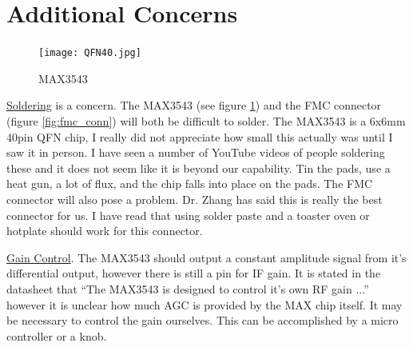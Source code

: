 \documentclass[a4paper, 12pt]{article}
\begin{document}
\section{Additional Concerns}

\begin{figure}
\caption{MAX3543}
\label{fig:qfn40}
\centerline{\texttt{[image: QFN40.jpg]}}
\end{figure}

\underline{Soldering} is a concern.  The MAX3543 (see figure \ref{fig:qfn40}) and the FMC connector (figure \ref{fig:fmc_conn}) will both be difficult to solder.  The MAX3543 is a 6x6mm 40pin QFN chip, I really did not appreciate how small this actually was until I saw it in person.  I have seen a number of YouTube videos of people soldering these and it does not seem like it is beyond our capability.  Tin the pads, use a heat gun, a lot of flux, and the chip falls into place on the pads.  The FMC connector will also pose a problem.  Dr. Zhang has said this is really the best connector for us.  I have read that using solder paste and a toaster oven or hotplate should work for this connector.

\underline{Gain Control}.  The MAX3543 should output a constant amplitude signal from it's differential output, however there is still a pin for IF gain.  It is stated in the datasheet that ``The MAX3543 is designed to control it's own RF gain ...'' however it is unclear how much AGC is provided by the MAX chip itself. It may be necessary to control the gain ourselves.  This can be accomplished by a micro controller or a knob. 

\clearpage


\end{document}
